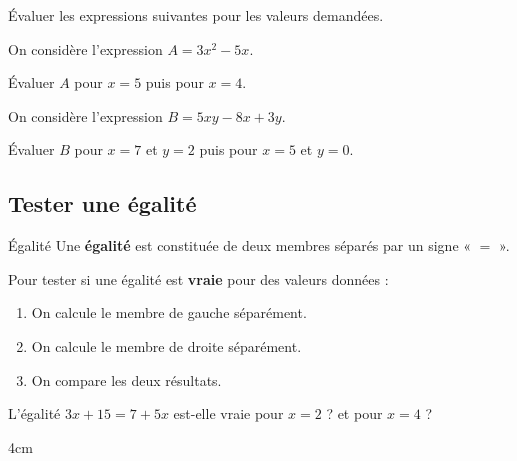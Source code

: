 \documentclass[a4paper]{book}
\begin{document}
    
    \begin{exemple}
        Évaluer les expressions suivantes pour les valeurs demandées.

        \smallskip

        \begin{minipage}{0.49\linewidth}
            On considère l'expression $A=3x^2-5x$.

            \smallskip

            Évaluer $A$ pour $x=5$ puis pour $x=4$.

            \vspace{4.5cm}
        \end{minipage}
        \hfill\vline\hfill
        \begin{minipage}{0.49\linewidth}
            On considère l'expression $B=5xy-8x+3y$.

            \smallskip

            Évaluer $B$ pour $x=7$ et $y=2$ puis pour $x=5$ et $y=0$.

            \vspace{4.5cm}
        \end{minipage}
    \end{exemple}
    
    
\subsection{Tester une égalité}
    
    \begin{definitionTitre}{Égalité}
        Une \textbf{égalité} est constituée de deux membres séparés par un signe « $=$ ».
    \end{definitionTitre}
    
    
    \begin{methode}
        Pour tester si une égalité est \textbf{vraie} pour des valeurs données :
        \begin{enumerate}
            \item On calcule le membre de gauche séparément.
            \item On calcule le membre de droite séparément.
            \item On compare les deux résultats.
        \end{enumerate}
    \end{methode}
    
    
    \begin{exemple}
        L'égalité $3x + 15 = 7 + 5x$ est-elle vraie pour $x = 2$ ? et pour $x = 4$ ?
        \begin{ZoneReponse}{4cm}
            
        \end{ZoneReponse}
    \end{exemple}
    
\end{document}
